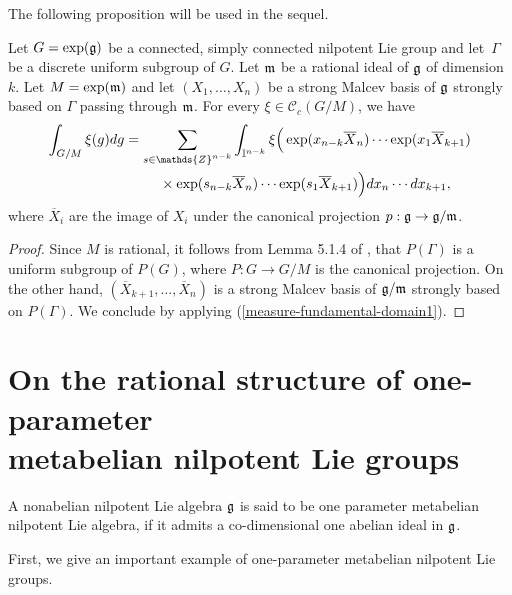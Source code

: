 \documentclass[pdftex]{sigma}
\def\tore{{\mathbb I}}
\begin{document}
 The following
proposition will be used  in the sequel.

\begin{proposition}\label{decompositionmesure}
Let $G = \exp(\frak g)$ be a connected, simply connected nilpotent
Lie group and let~$\Gamma$ be a discrete uniform subgroup of $G$.
Let  $\frak m$ be a rational ideal of $\frak g$ of dimension $k$.
Let $M= \exp(\frak m)$ and let $(X_1, \ldots, X_n)$ be a strong
Malcev basis of $\frak g$ strongly based on $\Gamma$ passing through
$\frak m $.  For every $\xi\in \mathcal{C}_c(G/M)$, we have
\begin{gather*}%
\int_{G/M}  \xi(g)   dg   =
 \sum_{s\in \mathds{Z}^{n-k}}
\int_{\tore^{n-k}}  \xi\Big(\exp(x_{n-k} \overline{X}_n)\cdots
\exp(x_1 \overline{X}_{k+1})\\
\hphantom{\int_{G/M}  \xi(g)   dg   =}{}\times
\exp(s_{n-k} \overline{X}_n)\cdots
\exp(s_1 \overline{X}_{k+1})\Big)
   dx_n\cdots dx_{k+1},
   \end{gather*}
where $\overline{X}_i$ are the image of $X_i$ under the canonical
projection $p: \frak g\rightarrow \frak g/\frak m$.
\end{proposition}

 \begin{proof}
Since $M$ is rational, it follows  from  Lemma 5.1.4 of \cite{Cor1},
that $P(\Gamma)$ is a uniform subgroup of $P(G)$, where $P: G
\rightarrow G/M$ is the canonical projection. On the other hand,
$(\overline{X}_{k+1}, \ldots, \overline{X}_{n})$ is a strong Malcev
basis of $\frak g/\frak m$ strongly based on $P(\Gamma)$. We
conclude by applying (\ref{measure-fundamental-domain1}).
 \end{proof}



\section{On the rational structure  of
one-parameter\\ metabelian nilpotent Lie groups}\label{section4}


\begin{definition}
A nonabelian nilpotent Lie algebra  $\frak g$ is said to be one
parameter metabelian nilpotent Lie algebra, if it admits  a
co-dimensional one abelian ideal
 in $\frak g$. \end{definition}


First, we give an important example of one-parameter metabelian
nilpotent Lie groups.
\end{document}
